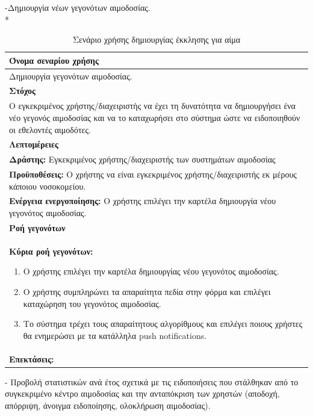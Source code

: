 \newpage
-Δημιουργία νέων γεγονότων αιμοδοσίας.
\\*
\begin{table}[H]
	\begin{center}
	    \begin{tabular}{|p{\dimexpr \linewidth-2\tabcolsep}|}
	    \hline
	    \rowcolor{grayy}
	    \textbf{Όνομα σεναρίου χρήσης}
	    \\ \hline    
	    Δημιουργία γεγονότων αιμοδοσίας.
	     \\ \hline
	    \rowcolor{grayy}
	    \textbf{\textbf{Στόχος}}
	    \\ \hline
	 	 Ο εγκεκριμένος χρήστης/διαχειριστής να έχει τη δυνατότητα να δημιουργήσει ένα νέο γεγονός αιμοδοσίας και να το καταχωρήσει στο σύστημα ώστε να ειδοποιηθούν οι εθελοντές αιμοδότες.
	    \\ \hline
	    \rowcolor{grayy}
	    \textbf{Λεπτομέρειες}
	    \\ \hline
		\textbf{Δράστης:} Εγκεκριμένος χρήστης/διαχειριστής των συστημάτων αιμοδοσίας
		\\*
		\textbf{Προϋποθέσεις:} Ο χρήστης να είναι εγκεκριμένος χρήστης/διαχειριστής εκ μέρους κάποιου νοσοκομείου.
		\\*
		\textbf{Ενέργεια ενεργοποίησης:} Ο χρήστης επιλέγει την καρτέλα δημιουργία νέου γεγονότος αιμοδοσίας.
		\\ \hline
		\rowcolor{grayy}    
	    \textbf{Ροή γεγονότων}
	    \\ \hline
		\textbf{Κύρια ροή γεγονότων:}
		\begin{enumerate}
		\item	 Ο χρήστης επιλέγει την καρτέλα δημιουργίας νέου γεγονότος αιμοδοσίας.
		\item Ο χρήστης συμπληρώνει τα απαραίτητα πεδία στην φόρμα και επιλέγει καταχώρηση του γεγονότος αιμοδοσίας.
		\item Το σύστημα τρέχει τους απαραίτητους αλγορίθμους και επιλέγει ποιους χρήστες θα ενημερώσει με τα κατάλληλα push notifications.
		\end{enumerate}
		\\ \hline
		\rowcolor{grayy}
		\textbf{Επεκτάσεις:}
		   \\ \hline
	    \end{tabular}
	    \caption{Σενάριο χρήσης δημιουργίας έκκλησης για αίμα}
	    \label{tab:create_blood_donor_event} 
	\end{center}
\end{table}

\newpage
- Προβολή στατιστικών ανά έτος σχετικά με τις ειδοποιήσεις που στάλθηκαν από το συγκεκριμένο κέντρο αιμοδοσίας και την ανταπόκριση των χρηστών (αποδοχή, απόρριψη, άνοιγμα ειδοποίησης, ολοκλήρωση αιμοδοσίας).

